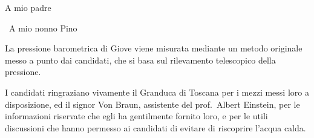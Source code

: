 \documentclass[%
,corpo=11.5pt
,twoside
,cucitura
,tipotesi=frontespizio
]{toptesi}
\begin{document}

\begin{Preambolo*}
\geometry{a4paper, left=35mm, right=35mm, top=25mm, bottom=25mm}
\end{Preambolo*}

\begin{frontespizio}
\end{frontespizio}
\paginavuota
\begin{dedica}
    A mio padre

    \textdagger\ A mio nonno Pino
\end{dedica}



\sommario%

 La pressione barometrica di Giove viene misurata
mediante un metodo originale  messo a punto dai candidati, che si basa
sul rilevamento telescopico della pressione.


\ringraziamenti%

I candidati ringraziano vivamente il Granduca di Toscana per i mezzi
messi loro a disposizione, ed il signor Von Braun, assistente del
prof.~Albert Einstein, per le informazioni riservate che egli ha
gentilmente fornito loro, e per le utili discussioni che hanno permesso
ai candidati di evitare di riscoprire l'acqua calda.
\end{document}
